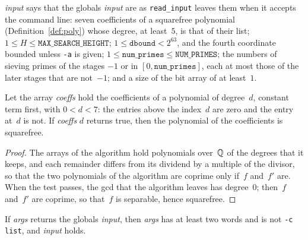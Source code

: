 \begin{definition}\label{def:Cli.Input.WF}
  \leanok
   \textit{input} says that the globals \textit{input} are as
  \texttt{read\_input} leaves them when it accepts the command line: seven coefficients of a
  squarefree polynomial (Definition~\ref{def:poly}) whose degree, at least~$5$, is that of their
  list; $1 \le H \le \mathtt{MAX\_SEARCH\_HEIGHT}$; $1 \le \mathtt{dbound} < 2^{63}$, and the fourth
  coordinate bounded unless \texttt{-a} is given;
  $1 \le \mathtt{num\_primes} \le \mathtt{NUM\_PRIMES}$; the numbers of sieving primes of the stages
  $-1$ or in $[0, \mathtt{num\_primes}]$, each at most those of the later stages that are not~$-1$;
  and a size of the bit array of at least~$1$.
\end{definition}

\begin{lemma}\label{lem:Cli.squarefree_spec}
  \leanok
  Let the array \textit{coeffs} hold the coefficients of a polynomial of degree~$d$, constant term
  first, with $0 < d < 7$: the entries above the index~$d$ are zero and the entry at~$d$ is not.
  If  \textit{coeffs} $d$ returns true, then the polynomial of the
  coefficients is squarefree.
\end{lemma}

\begin{proof}
  \leanok
  The arrays of the algorithm hold polynomials over~$\mathbb{Q}$ of the degrees that it keeps, and each
  remainder differs from its dividend by a multiple of the divisor, so that the two polynomials of
  the algorithm are coprime only if~$f$ and~$f'$ are. When the test passes, the gcd that the
  algorithm leaves has degree~$0$; then~$f$ and~$f'$ are coprime, so that~$f$ is separable, hence
  squarefree.
\end{proof}

\begin{lemma}\label{lem:Cli.readInput_spec}
  \leanok
  If  \textit{args} returns the globals \textit{input}, then
  \textit{args} has at least two words and is not \texttt{-c list}, and
   \textit{input} holds.
\end{lemma}


